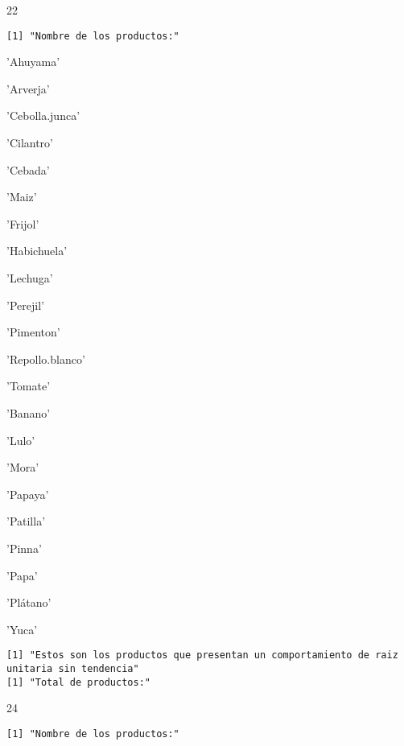 \documentclass[11pt]{article}
\begin{document}
    22

    
    \begin{Verbatim}[commandchars=\\\{\}]
[1] "Nombre de los productos:"

    \end{Verbatim}

    \begin{enumerate*}
\item 'Ahuyama'
\item 'Arverja'
\item 'Cebolla.junca'
\item 'Cilantro'
\item 'Cebada'
\item 'Maiz'
\item 'Frijol'
\item 'Habichuela'
\item 'Lechuga'
\item 'Perejil'
\item 'Pimenton'
\item 'Repollo.blanco'
\item 'Tomate'
\item 'Banano'
\item 'Lulo'
\item 'Mora'
\item 'Papaya'
\item 'Patilla'
\item 'Pinna'
\item 'Papa'
\item 'Plátano'
\item 'Yuca'
\end{enumerate*}


    
    \begin{Verbatim}[commandchars=\\\{\}]
[1] "Estos son los productos que presentan un comportamiento de raiz unitaria sin tendencia"
[1] "Total de productos:"

    \end{Verbatim}

    24

    
    \begin{Verbatim}[commandchars=\\\{\}]
[1] "Nombre de los productos:"

    \end{Verbatim}
\end{document}
